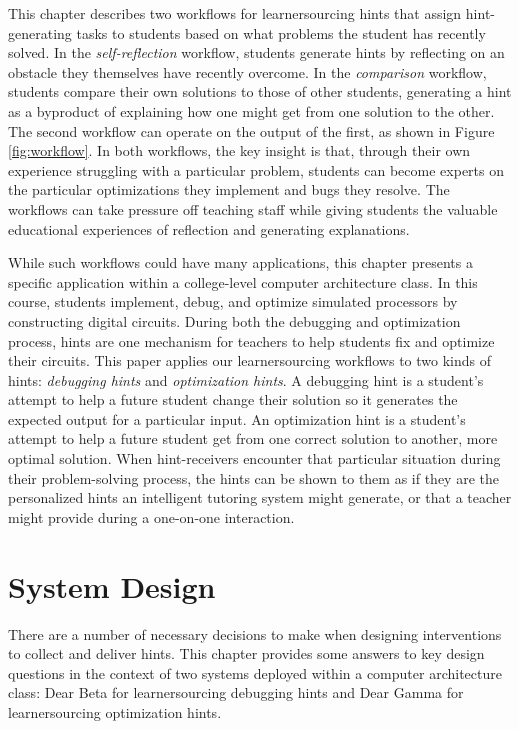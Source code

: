 This chapter describes two workflows for learnersourcing hints that assign hint-generating tasks to students based on what problems the student has recently solved. In the \textit{self-reflection} workflow, students generate hints by reflecting on an obstacle they themselves have recently overcome. In the \textit{comparison} workflow, students compare their own solutions to those of other students, generating a hint as a byproduct of explaining how one might get from one solution to the other. The second workflow can operate on the output of the first, as shown in Figure \ref{fig:workflow}. In both workflows, the key insight is that, through their own experience struggling with a particular problem, students can become experts on the particular optimizations they implement and bugs they resolve. The workflows can take pressure off teaching staff while giving students the valuable educational experiences of reflection and generating explanations. 

While such workflows could have many applications, this chapter presents a specific application within a college-level computer architecture class. In this course, students implement, debug, and optimize simulated processors by constructing digital circuits. During both the debugging and optimization process, hints are one mechanism for teachers to help students fix and optimize their circuits. This paper applies our learnersourcing workflows to two kinds of hints: \textit{debugging hints} and \textit{optimization hints}. A debugging hint is a student's attempt to help a future student change their solution so it generates the expected output for a particular input. An optimization hint is a student's attempt to help a future student get from one correct solution to another, more optimal solution. When hint-receivers encounter that particular situation during their problem-solving process, the hints can be shown to them as if they are the personalized hints an intelligent tutoring system might generate, or that a teacher might provide during a one-on-one interaction. 

\section{System Design}
There are a number of necessary decisions to make when designing interventions to collect and deliver hints. This chapter provides some answers to key design questions in the context of two systems deployed within a computer architecture class: Dear Beta for learnersourcing debugging hints and Dear Gamma for learnersourcing optimization hints.

